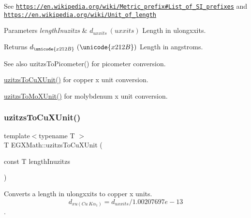 See \href{https://en.wikipedia.org/wiki/Metric_prefix#List_of_SI_prefixes}{\tt https\+://en.\+wikipedia.\+org/wiki/\+Metric\+\_\+prefix\#\+List\+\_\+of\+\_\+\+S\+I\+\_\+prefixes} and \href{https://en.wikipedia.org/wiki/Unit_of_length}{\tt https\+://en.\+wikipedia.\+org/wiki/\+Unit\+\_\+of\+\_\+length} 
\begin{DoxyParams}{Parameters}
{\em length\+Inuzitzs} & $ d_{uxxits}\ (uxxits)$ Length in ulongxxits. \\
\hline
\end{DoxyParams}
\begin{DoxyReturn}{Returns}
$ d_{\unicode{x212B}}\ (\unicode{x212B})$ Length in angstroms. 
\end{DoxyReturn}
\begin{DoxySeeAlso}{See also}
uzitzs\+To\+Picometer() for picometer conversion. 

\mbox{\hyperlink{group___e_g_x_math-_conversions-_length_conversions-uzitzs-_non-_s_i_gab25470e41b88c41d4bf32622baa6c472}{uzitzs\+To\+Cu\+X\+Unit()}} for copper x unit conversion. 

\mbox{\hyperlink{group___e_g_x_math-_conversions-_length_conversions-uzitzs-_non-_s_i_ga64b556911b0bb06cf315aa02f5e2d379}{uzitzs\+To\+Mo\+X\+Unit()}} for molybdenum x unit conversion. 
\end{DoxySeeAlso}
\mbox{\label{group___e_g_x_math-_conversions-_length_conversions-uzitzs-_non-_s_i_gab25470e41b88c41d4bf32622baa6c472}} 
\subsubsection{\texorpdfstring{uzitzs\+To\+Cu\+X\+Unit()}{uzitzsToCuXUnit()}}
{\footnotesize\ttfamily template$<$typename T $>$ \\
T E\+G\+X\+Math\+::uzitzs\+To\+Cu\+X\+Unit (\begin{DoxyParamCaption}\item[{const T}]{length\+Inuzitzs }\end{DoxyParamCaption})}



Converts a length in ulongxxits to copper x units. \[ d_{xu(Cu\ K\alpha_1)}=d_{uxxits} / 1.00207697e-13 \]. 


